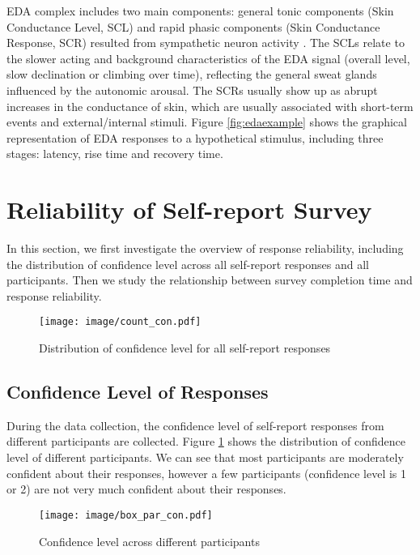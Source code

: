 \documentclass[sigconf]{acmart}
\begin{document}
EDA complex includes two main components: general tonic components (Skin Conductance Level, SCL) and rapid phasic components (Skin Conductance Response, SCR) resulted from sympathetic neuron activity \cite{guideeda}. The SCLs relate to the slower acting and background characteristics of the EDA signal (overall level, slow declination or climbing over time), reflecting the general sweat glands influenced by the autonomic arousal. The SCRs usually show up as abrupt increases in the conductance of skin, which are usually associated with short-term events and external/internal stimuli. Figure \ref{fig:edaexample} shows the graphical representation of EDA responses to a hypothetical stimulus, including three stages: latency, rise time and recovery time.

\section{Reliability of Self-report Survey}
\label{sec:reliability}
In this section, we first investigate the overview of response reliability, including the distribution of confidence level across all self-report responses and all participants. Then we study the relationship between survey completion time and response reliability.

\begin{figure}
    \centering
    \texttt{[image: image/count\_con.pdf]}
    \caption{Distribution of confidence level for all self-report responses}
    \label{fig:dis_con}
\end{figure}

\subsection{Confidence Level of Responses}

During the data collection, the confidence level of self-report responses from different participants are collected.
Figure \ref{fig:dis_con} shows the distribution of confidence level of different participants. We can see that most participants are moderately confident about their responses, however a few participants (confidence level is 1 or 2) are not very much confident about their responses. 



\begin{figure}
    \centering
    \texttt{[image: image/box\_par\_con.pdf]}
    \caption{Confidence level across different participants}
    \label{fig:box_confi}
\end{figure}
\end{document}
